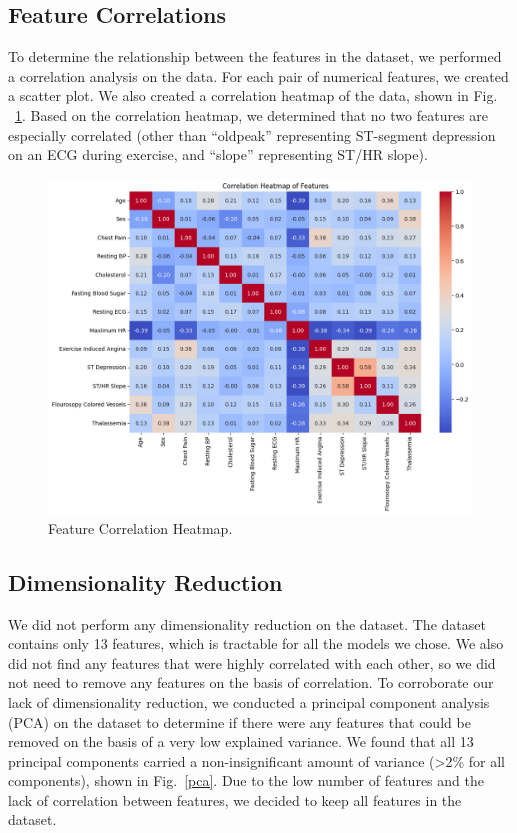 \subsection{Feature Correlations}
To determine the relationship between the features in the dataset, we performed a correlation analysis on the data. For each pair of numerical features, we created a scatter plot. We also created a correlation heatmap of the data, shown in Fig. ~\ref{featureheatmap}. Based on the correlation heatmap, we determined that no two features are especially correlated (other than ``oldpeak'' representing ST-segment depression on an ECG during exercise, and ``slope'' representing ST/HR slope).

\begin{figure}[htbp]
    \centerline{\includegraphics[width=0.9\columnwidth]{img/featureheatmap.png}}
    \caption{Feature Correlation Heatmap.}\label{featureheatmap}
\end{figure}

\subsection{Dimensionality Reduction}
We did not perform any dimensionality reduction on the dataset. The dataset contains only 13 features, which is tractable for all the models we chose. We also did not find any features that were highly correlated with each other, so we did not need to remove any features on the basis of correlation. To corroborate our lack of dimensionality reduction, we conducted a principal component analysis (PCA) on the dataset to determine if there were any features that could be removed on the basis of a very low explained variance. We found that all 13 principal components carried a non-insignificant amount of variance (>2\% for all components), shown in Fig.~\ref{pca}. Due to the low number of features and the lack of correlation between features, we decided to keep all features in the dataset.

